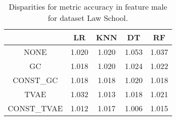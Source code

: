 \begin{table}
\caption{Disparities for metric accuracy in feature male for dataset Law School.}
\label{tab:disp-LAW SCHOOL-male-accuracy}
\begin{tabular}{ccccc}
\toprule
 & LR & KNN & DT & RF \\
\midrule
NONE & 1.020 & 1.020 & 1.053 & 1.037 \\
GC & 1.018 & 1.020 & 1.024 & 1.022 \\
CONST\_GC & 1.018 & 1.018 & 1.020 & 1.018 \\
TVAE & 1.032 & 1.013 & 1.018 & 1.021 \\
CONST\_TVAE & 1.012 & 1.017 & 1.006 & 1.015 \\
\bottomrule
\end{tabular}
\end{table}
